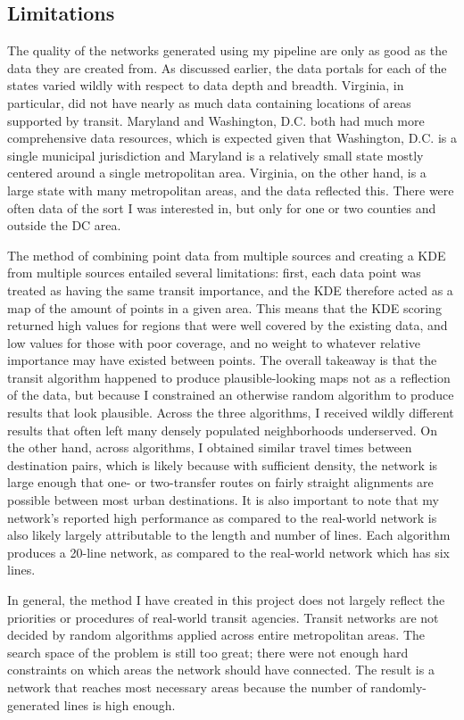 \documentclass[manuscript,nonacm]{acmart}
\begin{document}
\subsection{Limitations}
The quality of the networks generated using my pipeline are only as good as the data they are created from. As discussed earlier, the data portals for each of the states varied wildly with respect to data depth and breadth. Virginia, in particular, did not have nearly as much data containing locations of areas supported by transit. Maryland and Washington, D.C. both had much more comprehensive data resources, which is expected given that Washington, D.C. is a single municipal jurisdiction and Maryland is a relatively small state mostly centered around a single metropolitan area. Virginia, on the other hand, is a large state with many metropolitan areas, and the data reflected this. There were often data of the sort I was interested in, but only for one or two counties and outside the DC area. 

The method of combining point data from multiple sources and creating a KDE from multiple sources entailed several limitations: first, each data point was treated as having the same transit importance, and the KDE therefore acted as a map of the amount of points in a given area. This means that the KDE scoring returned high values for regions that were well covered by the existing data, and low values for those with poor coverage, and no weight to whatever relative importance may have existed between points. The overall takeaway is that the transit algorithm happened to produce plausible-looking maps not as a reflection of the data, but because I constrained an otherwise random algorithm to produce results that look plausible. Across the three algorithms, I received wildly different results that often left many densely populated neighborhoods underserved. On the other hand, across algorithms, I obtained similar travel times between destination pairs, which is likely because with sufficient density, the network is large enough that one- or two-transfer routes on fairly straight alignments are possible between most urban destinations. It is also important to note that my network's reported high performance as compared to the real-world network is also likely largely attributable to the length and number of lines. Each algorithm produces a 20-line network, as compared to the real-world network which has six lines. 

In general, the method I have created in this project does not largely reflect the priorities or procedures of real-world transit agencies. Transit networks are not decided by random algorithms applied across entire metropolitan areas. The search space of the problem is still too great; there were not enough hard constraints on which areas the network should have connected. The result is a network that reaches most necessary areas because the number of randomly-generated lines is high enough. 
\end{document}

